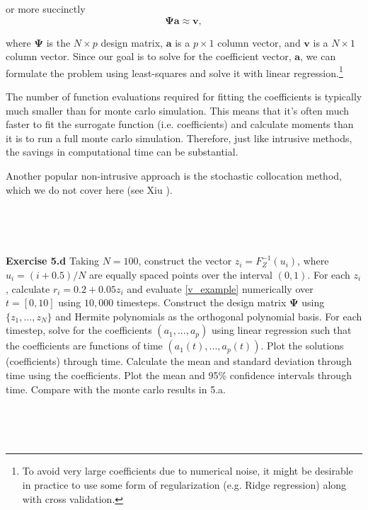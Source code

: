 \documentclass[11pt]{article}
\numberwithin{equation}{section}
\begin{document}
or more succinctly
\begin{equation}
\mathbf{\Psi} \mathbf{a} \approx \mathbf{v},
\end{equation}

where $\mathbf{\Psi}$ is the $N \times p$ design matrix, $\mathbf{a}$ is a $p \times 1$ column vector, and $\mathbf{v}$ is a $N \times 1$ column vector. Since our goal is to solve for the coefficient vector, $\mathbf{a}$, we can formulate the problem using least-squares and solve it with linear regression.\footnote{To avoid very large coefficients due to numerical noise, it might be desirable in practice to use some form of regularization (e.g. Ridge regression) along with cross validation.}

\qquad The number of function evaluations required for fitting the coefficients is typically much smaller than for monte carlo simulation. This means that it's often much faster to fit the surrogate function (i.e. coefficients) and calculate moments than it is to run a full monte carlo simulation. Therefore, just like intrusive methods, the savings in computational time can be substantial.

\qquad Another popular non-intrusive approach is the stochastic collocation method, which we do not cover here (see Xiu \cite{X10}).







\

\

\textbf{Exercise 5.d} Taking $N = 100$, construct the vector $z_i = F_Z^{-1}(u_i)$, where $u_i = (i + 0.5)/N$ are equally spaced points over the interval $(0, 1)$. For each $z_i$, calculate $r_i = 0.2 + 0.05 z_i$ and evaluate \eqref{v_example} numerically over $t = [0, 10]$ using $10,000$ timesteps. Construct the design matrix $\mathbf{\Psi}$ using $\{ z_1, ..., z_N \}$ and Hermite polynomials as the orthogonal polynomial basis. For each timestep, solve for the coefficients $(a_1, ..., a_p)$ using linear regression such that the coefficients are functions of time $(a_1(t), ..., a_p(t))$. Plot the solutions (coefficients) through time. Calculate the mean and standard deviation through time using the coefficients. Plot the mean and 95\% confidence intervals through time. Compare with the monte carlo results in 5.a.

\

\
\end{document}
